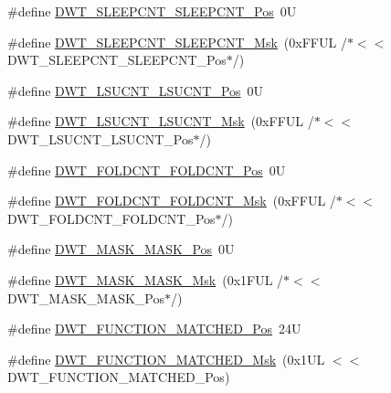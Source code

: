 \begin{DoxyCompactItemize}
\#define \mbox{\hyperlink{group___c_m_s_i_s___d_w_t_ga0371a84a7996dc5852c56afb2676ba1c}{D\+W\+T\+\_\+\+S\+L\+E\+E\+P\+C\+N\+T\+\_\+\+S\+L\+E\+E\+P\+C\+N\+T\+\_\+\+Pos}}~0U
\item 
\#define \mbox{\hyperlink{group___c_m_s_i_s___d_w_t_ga1e340751d71413fef400a0a1d76cc828}{D\+W\+T\+\_\+\+S\+L\+E\+E\+P\+C\+N\+T\+\_\+\+S\+L\+E\+E\+P\+C\+N\+T\+\_\+\+Msk}}~(0x\+F\+F\+U\+L /$\ast$$<$$<$ D\+W\+T\+\_\+\+S\+L\+E\+E\+P\+C\+N\+T\+\_\+\+S\+L\+E\+E\+P\+C\+N\+T\+\_\+\+Pos$\ast$/)
\item 
\#define \mbox{\hyperlink{group___c_m_s_i_s___d_w_t_gab9394c7911b0b4312a096dad91d53a3d}{D\+W\+T\+\_\+\+L\+S\+U\+C\+N\+T\+\_\+\+L\+S\+U\+C\+N\+T\+\_\+\+Pos}}~0U
\item 
\#define \mbox{\hyperlink{group___c_m_s_i_s___d_w_t_ga2186d7fc9317e20bad61336ee2925615}{D\+W\+T\+\_\+\+L\+S\+U\+C\+N\+T\+\_\+\+L\+S\+U\+C\+N\+T\+\_\+\+Msk}}~(0x\+F\+F\+U\+L /$\ast$$<$$<$ D\+W\+T\+\_\+\+L\+S\+U\+C\+N\+T\+\_\+\+L\+S\+U\+C\+N\+T\+\_\+\+Pos$\ast$/)
\item 
\#define \mbox{\hyperlink{group___c_m_s_i_s___d_w_t_ga7f8af5ac12d178ba31a516f6ed141455}{D\+W\+T\+\_\+\+F\+O\+L\+D\+C\+N\+T\+\_\+\+F\+O\+L\+D\+C\+N\+T\+\_\+\+Pos}}~0U
\item 
\#define \mbox{\hyperlink{group___c_m_s_i_s___d_w_t_ga9cb73d0342d38b14e41027d3c5c02647}{D\+W\+T\+\_\+\+F\+O\+L\+D\+C\+N\+T\+\_\+\+F\+O\+L\+D\+C\+N\+T\+\_\+\+Msk}}~(0x\+F\+F\+U\+L /$\ast$$<$$<$ D\+W\+T\+\_\+\+F\+O\+L\+D\+C\+N\+T\+\_\+\+F\+O\+L\+D\+C\+N\+T\+\_\+\+Pos$\ast$/)
\item 
\#define \mbox{\hyperlink{group___c_m_s_i_s___d_w_t_gaf798ae34e2b9280ea64f4d9920cd2e7d}{D\+W\+T\+\_\+\+M\+A\+S\+K\+\_\+\+M\+A\+S\+K\+\_\+\+Pos}}~0U
\item 
\#define \mbox{\hyperlink{group___c_m_s_i_s___d_w_t_gadd798deb0f1312feab4fb05dcddc229b}{D\+W\+T\+\_\+\+M\+A\+S\+K\+\_\+\+M\+A\+S\+K\+\_\+\+Msk}}~(0x1\+F\+U\+L /$\ast$$<$$<$ D\+W\+T\+\_\+\+M\+A\+S\+K\+\_\+\+M\+A\+S\+K\+\_\+\+Pos$\ast$/)
\item 
\#define \mbox{\hyperlink{group___c_m_s_i_s___d_w_t_ga22c5787493f74a6bacf6ffb103a190ba}{D\+W\+T\+\_\+\+F\+U\+N\+C\+T\+I\+O\+N\+\_\+\+M\+A\+T\+C\+H\+E\+D\+\_\+\+Pos}}~24U
\item 
\#define \mbox{\hyperlink{group___c_m_s_i_s___d_w_t_gac8b1a655947490280709037808eec8ac}{D\+W\+T\+\_\+\+F\+U\+N\+C\+T\+I\+O\+N\+\_\+\+M\+A\+T\+C\+H\+E\+D\+\_\+\+Msk}}~(0x1\+U\+L $<$$<$ D\+W\+T\+\_\+\+F\+U\+N\+C\+T\+I\+O\+N\+\_\+\+M\+A\+T\+C\+H\+E\+D\+\_\+\+Pos)
\item 
$$
\end{DoxyCompactItemize}
